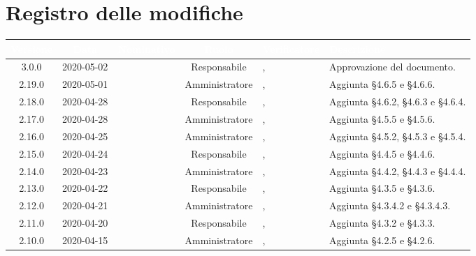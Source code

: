 \section*{Registro delle modifiche}
{
\renewcommand{\arraystretch}{1.5}
\centering
\begin{longtable}{ c c  C{2.3cm} c C{3cm} C{3.2cm}}
\textcolor{white}{\textbf{Versione}}&
\textcolor{white}{\textbf{Data}}&
\textcolor{white}{\textbf{Nominativo}}&
\textcolor{white}{\textbf{Ruolo}}&
\textcolor{white}{\textbf{Verificatore}}&
\textcolor{white}{\textbf{Descrizione}}\\	
\endhead

3.0.0 & 2020-05-02 & \DF{} & Responsabile &  \AT{}, \PF{} & Approvazione del documento.  \\

2.19.0 & 2020-05-01 & \BR{} & Amministratore &  \AT{}, \PF{} & Aggiunta §4.6.5 e §4.6.6.  \\

2.18.0 & 2020-04-28 & \LD{} & Responsabile &  \AT{}, \PF{} & Aggiunta §4.6.2, §4.6.3 e §4.6.4.  \\

2.17.0 & 2020-04-28 & \SE{} & Amministratore &  \AT{}, \PF{} & Aggiunta §4.5.5 e §4.5.6.  \\

2.16.0 & 2020-04-25 & \BR{} & Amministratore &  \AT{}, \PF{} & Aggiunta §4.5.2, §4.5.3 e §4.5.4.  \\

2.15.0 & 2020-04-24 & \LD{} & Responsabile &  \AT{}, \PF{} & Aggiunta §4.4.5 e §4.4.6.  \\

2.14.0 & 2020-04-23 & \BR{} & Amministratore &  \AT{}, \PF{} & Aggiunta §4.4.2, §4.4.3 e §4.4.4.  \\

2.13.0 & 2020-04-22 & \LD{} & Responsabile &  \AT{}, \PF{} & Aggiunta §4.3.5 e §4.3.6.  \\

2.12.0 & 2020-04-21 & \SE{} & Amministratore &  \AT{}, \PF{} & Aggiunta §4.3.4.2 e §4.3.4.3.  \\

2.11.0 & 2020-04-20 & \LD{} & Responsabile &  \AT{}, \PF{} & Aggiunta §4.3.2 e §4.3.3.  \\

2.10.0 & 2020-04-15 & \BR{} & Amministratore &  \AT{}, \PF{} & Aggiunta §4.2.5 e §4.2.6.  \\


\end{longtable}}

